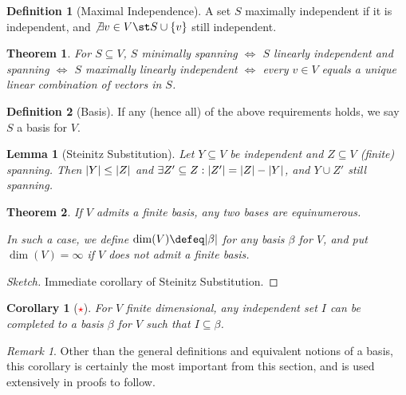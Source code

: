 \documentclass[12pt, oneside]{article}
\theoremstyle{definition}
\newtheorem{defn}{Definition}
\theoremstyle{plain}
\newtheorem{thm}{Theorem}
\newtheorem{cor}{Corollary}
\newtheorem{lemma}{Lemma}
\theoremstyle{remark}
\newtheorem{remark}{Remark}
\begin{document}
\begin{defn}[Maximal Independence]
  A set $S$ maximally independent if it is independent, and $\not \exists v \in V \st S \cup \{v\}$ still independent.
\end{defn}

\begin{thm}
  For $S \subseteq V$, $S$ minimally spanning $\iff$ $S$ linearly independent and spanning $\iff$ $S$ maximally linearly independent $\iff$ every $v \in V$ equals a \emph{unique} linear combination of vectors in $S$.
\end{thm}

\begin{defn}[Basis]
  If any (hence all) of the above requirements holds, we say $S$ a basis for $V$.
\end{defn}

\begin{lemma}[Steinitz Substitution]
  Let $Y \subseteq V$ be independent and $Z \subseteq V$ (finite) spanning. Then $\abs{Y} \leq \abs{Z}$ and $\exists Z' \subseteq Z : \abs{Z'} =\abs{Z} - \abs{Y}$, and $Y \cup Z'$ still spanning.
\end{lemma}
\begin{thm}
  If $V$ admits a finite basis, any two bases are equinumerous.
  
  In such a case, we define $\dim(V) \defeq  \abs{\beta}$ for any basis $\beta$ for $V$, and put $\dim(V) = \infty$ if $V$ does not admit a finite basis.
\end{thm}
\begin{proof}[Sketch]
  Immediate corollary of Steinitz Substitution.
\end{proof}

\begin{cor}[\textcolor{red}{$\star$}]
  For $V$ finite dimensional, any independent set $I$ can be completed to a basis $\beta$ for $V$ such that $I \subseteq \beta$.
\end{cor}

\begin{remark}
  Other than the general definitions and equivalent notions of a basis, this corollary is certainly the most important from this section, and is used extensively in proofs to follow.
\end{remark}
\end{document}
